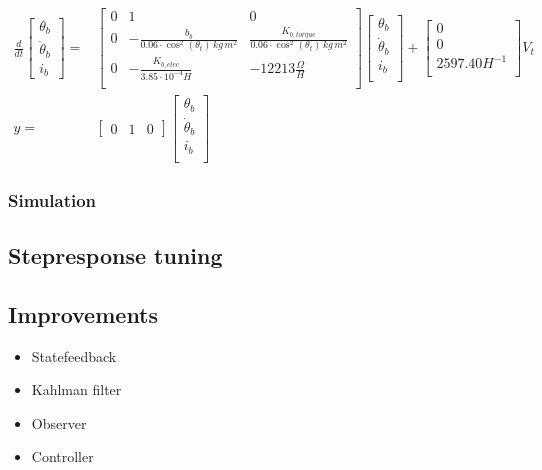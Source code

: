 \documentclass[../../main]{subfiles}
\begin{document}
\begin{equation}
      \label{eq:Theoretical_models_buttom}
      \begin{split}
      \frac{d}{dt}
          \begin{bmatrix}
              \theta_b        \\
              \dot \theta_b   \\
              i_b
          \end{bmatrix}
        =&
          \begin{bmatrix}
              0 & 1                         & 0                         \\
              0 & -\frac{b_b}{0.06\cdot \cos^2(\theta_t) \si{\,kg\,m^2}} & \frac{K_{b,torque}}{0.06\cdot \cos^2(\theta_t)\si{\,kg\,m^2}}  \\
              0 & -\frac{K_{b,elec}}{3.85\cdot 10^{-4}\si{H}}   & -12213 \si{\frac{\Omega}{H}}          \\
          \end{bmatrix}
    \begin{bmatrix}
        \theta_b        \\
        \dot \theta_b   \\
        i_b             \\
    \end{bmatrix}
        +
    \begin{bmatrix}
        0             \\
        0             \\
        2597.40 \si{H^{-1}} \\
    \end{bmatrix}
    V_t
\\
      y =&
    \begin{bmatrix}
        0 & 1 & 0
    \end{bmatrix}
    \begin{bmatrix}
        \theta_b \\
        \dot \theta_b\\
        i_b\\
    \end{bmatrix}
  \end{split}
\end{equation}


\subsubsection{Simulation}

\subsection{Stepresponse tuning}
\label{ch:stepresponse_tuning}


\subsection{Improvements}

\begin{itemize}
  \item Statefeedback
  \item Kahlman filter
  \item Observer
  \item Controller
\end{itemize}
\end{document}
